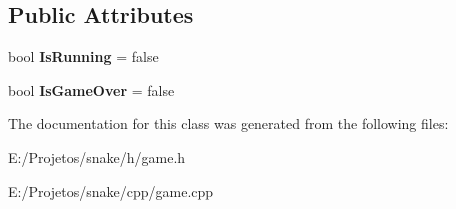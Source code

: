 \subsection*{Public Attributes}
\begin{DoxyCompactItemize}
\item 
\hypertarget{class_game_a5bda2cd7678a74d59ab2a133f6521056}{}bool {\bfseries Is\+Running} = false\label{class_game_a5bda2cd7678a74d59ab2a133f6521056}

\item 
\hypertarget{class_game_ae09d990c49130054253bb9324476c3f6}{}bool {\bfseries Is\+Game\+Over} = false\label{class_game_ae09d990c49130054253bb9324476c3f6}

\end{DoxyCompactItemize}


The documentation for this class was generated from the following files\+:\begin{DoxyCompactItemize}
\item 
E\+:/\+Projetos/snake/h/game.\+h\item 
E\+:/\+Projetos/snake/cpp/game.\+cpp\end{DoxyCompactItemize}
